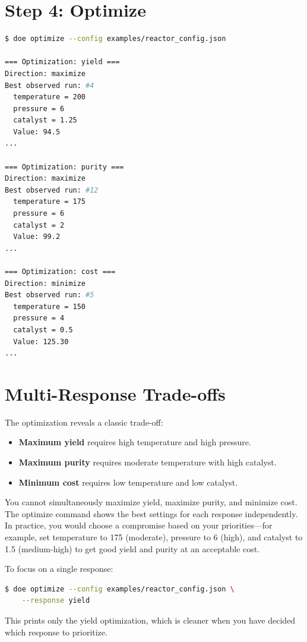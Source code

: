 \documentclass[11pt]{book}
\begin{document}
\section{Step 4: Optimize}

\begin{lstlisting}[language=bash]
$ doe optimize --config examples/reactor_config.json

=== Optimization: yield ===
Direction: maximize
Best observed run: #4
  temperature = 200
  pressure = 6
  catalyst = 1.25
  Value: 94.5
...

=== Optimization: purity ===
Direction: maximize
Best observed run: #12
  temperature = 175
  pressure = 6
  catalyst = 2
  Value: 99.2
...

=== Optimization: cost ===
Direction: minimize
Best observed run: #5
  temperature = 150
  pressure = 4
  catalyst = 0.5
  Value: 125.30
...
\end{lstlisting}

\section{Multi-Response Trade-offs}

The optimization reveals a classic trade-off:
\begin{itemize}
  \item \textbf{Maximum yield} requires high temperature and high pressure.
  \item \textbf{Maximum purity} requires moderate temperature with high catalyst.
  \item \textbf{Minimum cost} requires low temperature and low catalyst.
\end{itemize}

You cannot simultaneously maximize yield, maximize purity, and minimize cost. The optimize command shows the best settings for each response independently. In practice, you would choose a compromise based on your priorities---for example, set temperature to 175 (moderate), pressure to 6 (high), and catalyst to 1.5 (medium-high) to get good yield and purity at an acceptable cost.

\begin{keypoint}
To focus on a single response:
\begin{lstlisting}[language=bash]
$ doe optimize --config examples/reactor_config.json \
    --response yield
\end{lstlisting}
This prints only the yield optimization, which is cleaner when you have decided which response to prioritize.
\end{keypoint}
\end{document}
